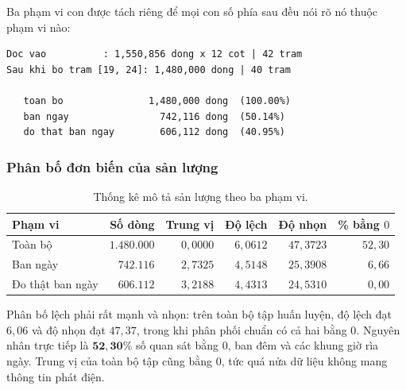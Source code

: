 \documentclass[12pt, a4paper]{report}
\begin{document}
Ba phạm vi con được tách riêng để mọi con số phía sau đều nói rõ nó thuộc phạm vi nào:

\begingroup
\par{}\vspace{8pt}
\small\renewcommand{\baselinestretch}{1.0}\selectfont
\begin{verbatim}
Doc vao          : 1,550,856 dong x 12 cot | 42 tram
Sau khi bo tram [19, 24]: 1,480,000 dong | 40 tram

   toan bo               1,480,000 dong  (100.00%)
   ban ngay                742,116 dong  (50.14%)
   do that ban ngay        606,112 dong  (40.95%)
\end{verbatim}
\par\vspace{8pt}
\endgroup
\subsubsection{Phân bố đơn biến của sản lượng}

\begin{table}[htbp]
\centering
\caption{Thống kê mô tả sản lượng theo ba phạm vi.}
\label{tab:eda_mo_ta}
\small
\begin{tabular}{l r r r r r}
\toprule
\textbf{Phạm vi} & \textbf{Số dòng} & \textbf{Trung vị} & \textbf{Độ lệch} & \textbf{Độ nhọn} & \textbf{\% bằng $0$} \\
\midrule
Toàn bộ          & $1.480.000$ & $0{,}0000$ & $6{,}0612$ & $47{,}3723$ & $52{,}30$ \\
Ban ngày         & $742.116$   & $2{,}7325$ & $4{,}5148$ & $25{,}3908$ & $6{,}66$ \\
Đo thật ban ngày & $606.112$   & $3{,}2188$ & $4{,}4313$ & $24{,}5310$ & $0{,}00$ \\
\bottomrule
\end{tabular}
\end{table}

Phân bố lệch phải rất mạnh và nhọn: trên toàn bộ tập huấn luyện, độ lệch đạt $6{,}06$ và độ
nhọn đạt $47{,}37$, trong khi phân phối chuẩn có cả hai bằng $0$. Nguyên nhân trực tiếp là
$\mathbf{52{,}30\%}$ số quan sát bằng $0$, ban đêm và các khung giờ rìa ngày. Trung vị của
toàn bộ tập cũng bằng $0$, tức quá nửa dữ liệu không mang thông tin phát điện.
\end{document}
